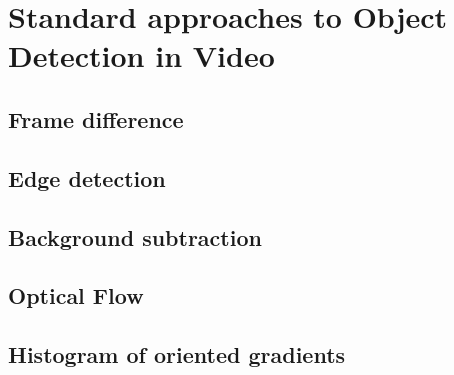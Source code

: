 \chapter{Standard approaches to Object Detection in Video}

\section*{Frame difference}
\section{Edge detection}
\section*{Background subtraction}
\section{Optical Flow}
\section{Histogram of oriented gradients}
